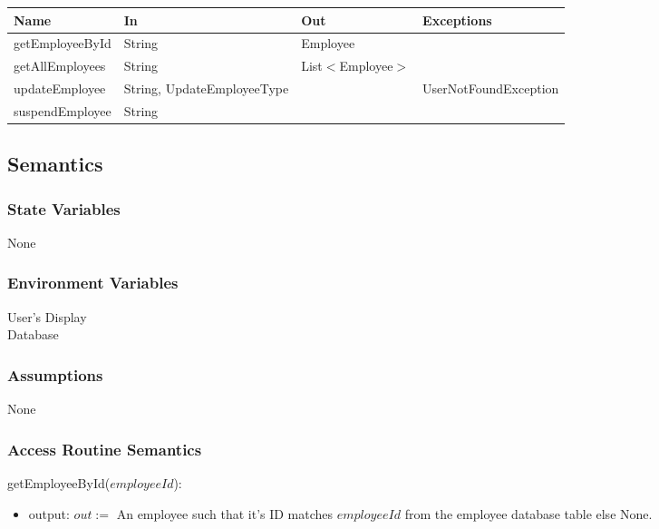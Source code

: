 \documentclass[12pt, titlepage]{article}
\begin{document}
\begin{center}
	\begin{adjustbox}{width=\textwidth}
		\begin{tabular}{llll}
			\hline
			\textbf{Name}   & \textbf{In}                & \textbf{Out}       & \textbf{Exceptions}   \\
			\hline
			getEmployeeById & String                     & Employee           & ~                     \\
			getAllEmployees & String                     & List$<$Employee$>$ & ~                     \\
			updateEmployee  & String, UpdateEmployeeType & ~                  & UserNotFoundException \\
			suspendEmployee & String                     & ~                  & ~                     \\
			\hline
		\end{tabular}
	\end{adjustbox}
\end{center}

\subsection{Semantics}

\subsubsection{State Variables}

None

\subsubsection{Environment Variables}

User's Display \\ Database

\subsubsection{Assumptions}

None

\subsubsection{Access Routine Semantics}

\noindent getEmployeeById($employeeId$):
\begin{itemize}
	\item output: $out :=$ An employee such that it's ID matches $employeeId$ from the employee database
	      table else None.
\end{itemize}
\end{document}
